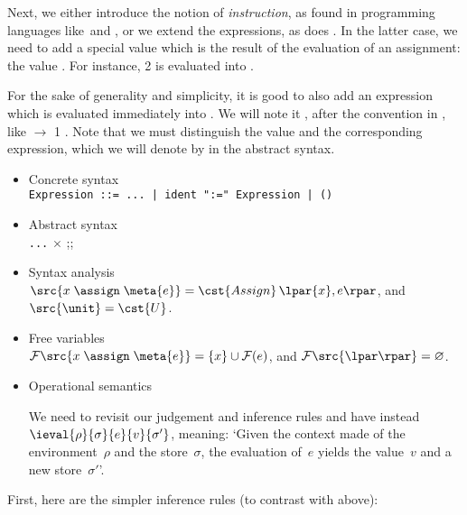 Next, we either introduce the notion of \emph{instruction}, as found
in programming languages like~\Clang and \Java, or we extend the
expressions, as does \OCaml. In the latter case, we need to add a
special value which is the result of the evaluation of an assignment:
the value . For instance,  \assign \num{2} is
evaluated into .

For the sake of generality and simplicity, it is good to also add an
expression which is evaluated immediately into . We will
note it \lpar\rpar, after the convention in \OCaml, like
\Xlet {} \equal \Xfun {} $\rightarrow$ \num{1}
\Xin {} \lpar\rpar. Note that we must distinguish the
value  and the corresponding expression, which we will
denote by  in the abstract syntax.
\begin{itemize}

  \item Concrete syntax\\
\texttt{Expression ::= ... | ident ":=" Expression | ()}

  \item Abstract syntax\\
     \Xtype {} \equal \texttt{...} \vbar {} \Xof
     \(\times\)  \vbar {}\textsf{;;}{}

  \item Syntax analysis\\
  $\src{x \; \assign \; \meta{e}} = \cst{Assign} \, \lpar{x},
  e\rpar$, and $\src{\unit} = \cst{U}$.

  \item Free variables\\
  $\mathcal{F} \src{x \; \assign \; \meta{e}} = \{x\} \cup \mathcal{F}(e)$,
  and $\mathcal{F}\src{\lpar\rpar} = \varnothing$.

  \item Operational semantics

  We need to revisit our judgement and inference rules and have
  instead $\ieval{\rho}{\sigma}{e}{v}{\sigma'}$, meaning: `Given the
  context made of the environment~$\rho$ and the store~$\sigma$, the
  evaluation of~$e$ yields the value~$v$ and a new store~$\sigma'$'.

\end{itemize}
First, here are the simpler inference rules (to contrast with
 above):
